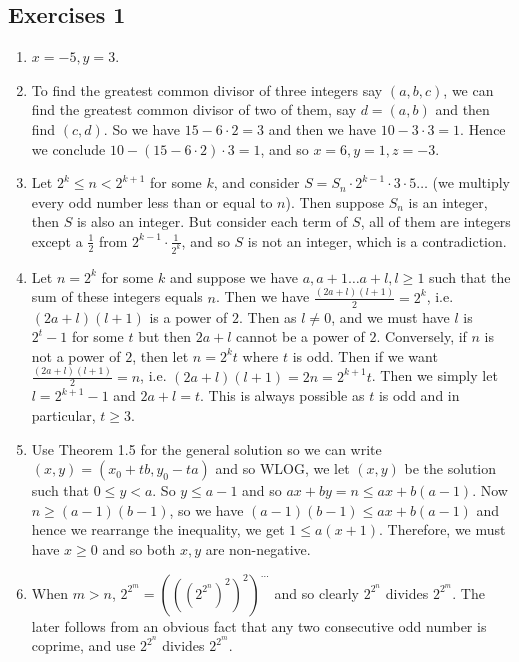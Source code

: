 \subsection{Exercises 1}
\begin{enumerate}
\item $x=-5, y=3$.
\item To find the greatest common divisor of three integers say $(a,b,c)$, we can find the greatest common divisor of two of them, say $d=(a,b)$ and then find $(c,d)$. So we have $15 - 6 \cdot 2=3$ and then we have $10 - 3 \cdot 3 =1$. Hence we conclude $10 - (15- 6 \cdot 2) \cdot 3 =1$, and so $x = 6, y =1, z= -3$.
\item Let $2^k \le n < 2^{k+1}$ for some $k$, and consider $S = S_n \cdot 2^{k-1} \cdot 3 \cdot 5 \ldots$ (we multiply every odd number less than or equal to $n$). Then suppose $S_n$ is an integer, then $S$ is also an integer. But consider each term of $S$, all of them are integers except a $\frac{1}{2}$ from $2^{k-1} \cdot \frac{1}{2^k}$, and so $S$ is not an integer, which is a contradiction.
\item Let $n = 2^k$ for some $k$ and suppose we have $a,a+1 \ldots a+l, l \ge 1$ such that the sum of these integers equals $n$. Then we have $\frac{(2a+l)(l+1)}{2}=2^k$, i.e. $(2a+l)(l+1)$ is a power of $2$. Then as $l \neq 0$, and we must have $l$ is $2^t -1$ for some $t$ but then $2a+l$ cannot be a power of $2$. Conversely, if $n$ is not a power of $2$, then let $n=2^k t$ where $t$ is odd. Then if we want $\frac{(2a+l)(l+1)}{2}=n$, i.e. $(2a+l)(l+1)=2n=2^{k+1}t$. Then we simply let $l=2^{k+1}-1$ and $2a +l = t$. This is always possible as $t$ is odd and in particular, $t \ge 3$.
\item Use Theorem 1.5 for the general solution so we can write $(x,y)=(x_0+tb,y_0-ta)$ and so WLOG, we let $(x,y)$ be the solution such that $0 \le y <a$. So $y \le a-1$ and so $ax+by=n \le ax+b(a-1)$. Now $n \ge (a-1)(b-1)$, so we have $(a-1)(b-1) \le ax+b(a-1)$ and hence we rearrange the inequality, we get $1 \le a(x+1)$. Therefore, we must have $x \ge 0$ and so both $x,y$ are non-negative.\\
\item When $m>n$, $2^{2^m}=(((2^{2^n})^2)^2)^{\ldots}$ and so clearly $2^{2^n}$ divides $2^{2^m}$. The later follows from an obvious fact that any two consecutive odd number is coprime, and use $2^{2^n}$ divides $2^{2^m}$.
\end{enumerate}
